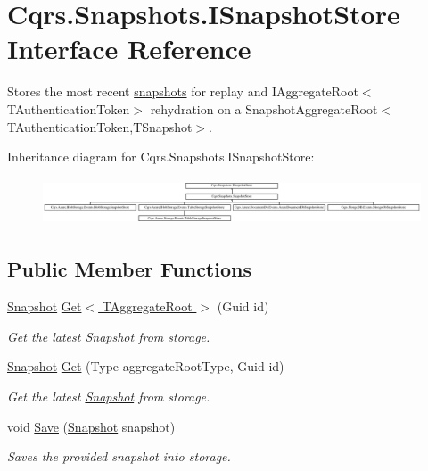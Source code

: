 \hypertarget{interfaceCqrs_1_1Snapshots_1_1ISnapshotStore}{}\section{Cqrs.\+Snapshots.\+I\+Snapshot\+Store Interface Reference}
\label{interfaceCqrs_1_1Snapshots_1_1ISnapshotStore}


Stores the most recent \hyperlink{classCqrs_1_1Snapshots_1_1Snapshot}{snapshots} for replay and I\+Aggregate\+Root$<$\+T\+Authentication\+Token$>$ rehydration on a Snapshot\+Aggregate\+Root$<$\+T\+Authentication\+Token,\+T\+Snapshot$>$.  


Inheritance diagram for Cqrs.\+Snapshots.\+I\+Snapshot\+Store\+:\begin{figure}[H]
\begin{center}
\leavevmode
\includegraphics[height=1.421320cm]{interfaceCqrs_1_1Snapshots_1_1ISnapshotStore}
\end{center}
\end{figure}
\subsection*{Public Member Functions}
\begin{DoxyCompactItemize}
\item 
\hyperlink{classCqrs_1_1Snapshots_1_1Snapshot}{Snapshot} \hyperlink{interfaceCqrs_1_1Snapshots_1_1ISnapshotStore_ab7bd163fc9cd5c3bd5911679030be403_ab7bd163fc9cd5c3bd5911679030be403}{Get$<$ T\+Aggregate\+Root $>$} (Guid id)
\begin{DoxyCompactList}\small\item\em Get the latest \hyperlink{classCqrs_1_1Snapshots_1_1Snapshot}{Snapshot} from storage. \end{DoxyCompactList}\item 
\hyperlink{classCqrs_1_1Snapshots_1_1Snapshot}{Snapshot} \hyperlink{interfaceCqrs_1_1Snapshots_1_1ISnapshotStore_a25efb06a4a6fcc9246d4572777c95dd5_a25efb06a4a6fcc9246d4572777c95dd5}{Get} (Type aggregate\+Root\+Type, Guid id)
\begin{DoxyCompactList}\small\item\em Get the latest \hyperlink{classCqrs_1_1Snapshots_1_1Snapshot}{Snapshot} from storage. \end{DoxyCompactList}\item 
void \hyperlink{interfaceCqrs_1_1Snapshots_1_1ISnapshotStore_a6e99c620115ce8a0648a83bf2ce05527_a6e99c620115ce8a0648a83bf2ce05527}{Save} (\hyperlink{classCqrs_1_1Snapshots_1_1Snapshot}{Snapshot} snapshot)
\begin{DoxyCompactList}\small\item\em Saves the provided {\itshape snapshot}  into storage. \end{DoxyCompactList}\end{DoxyCompactItemize}


